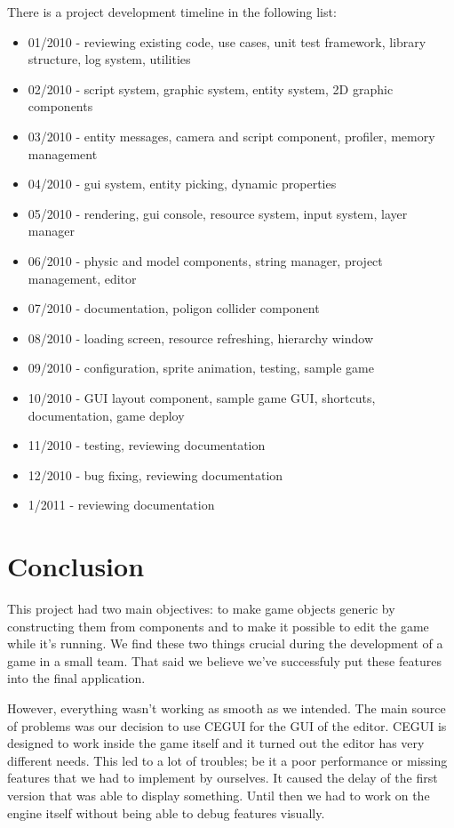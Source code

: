 \documentclass[a4paper,12pt]{article}
\begin{document}
There is a project development timeline in the following list:
\begin{itemize}
\item
01/2010 - reviewing existing code, use cases, unit test framework, library structure, log system, utilities
\item
02/2010 - script system, graphic system, entity system, 2D graphic components
\item
03/2010 - entity messages, camera and script component, profiler, memory management
\item
04/2010 - gui system, entity picking, dynamic properties
\item
05/2010 - rendering, gui console, resource system, input system, layer manager
\item
06/2010 - physic and model components, string manager, project management, editor
\item
07/2010 - documentation, poligon collider component
\item
08/2010 - loading screen, resource refreshing, hierarchy window
\item
09/2010 - configuration, sprite animation, testing, sample game
\item
10/2010 - GUI layout component, sample game GUI, shortcuts, documentation, game deploy
\item
11/2010 - testing, reviewing documentation
\item
12/2010 - bug fixing, reviewing documentation
\item
1/2011 - reviewing documentation
\end{itemize}

\section{Conclusion}
This project had two main objectives: to make game objects generic by constructing them from components and to make it possible to edit the game while it's running. We find these two things crucial during the development of a game in a small team. That said we believe we've successfuly put these features into the final application.

However, everything wasn't working as smooth as we intended. The main source of problems was our decision to use CEGUI for the GUI of the editor. CEGUI is designed to work inside the game itself and it turned out the editor has very different needs. This led to a lot of troubles; be it a poor performance or missing features that we had to implement by ourselves. It caused the delay of the first version that was able to display something. Until then we had to work on the engine itself without being able to debug features visually.
\end{document}
